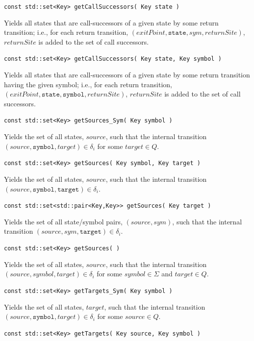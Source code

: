 \documentclass{llncs}
\begin{document}
\begin{description}
  \item\texttt{const std::set<Key> getCallSuccessors( Key state )}

    Yields all states that are call-successors of a given state by some return transition; i.e., for each return transition, $(exitPoint,\texttt{state},sym,returnSite)$, $returnSite$ is added to the set of call successors.

  \item\texttt{const std::set<Key> getCallSuccessors( Key state, Key symbol )}

    Yields all states that are call-successors of a given state by some return transition having the given symbol; i.e., for each return transition, $(exitPoint,\texttt{state},\texttt{symbol},returnSite)$, $returnSite$ is added to the set of call successors.

  \item\texttt{const std::set<Key> getSources\_Sym( Key symbol )}

    Yields the set of all states, $source$, such that the internal transition $(source,\texttt{symbol},target) \in \delta_i$ for some $target \in Q$.

  \item\texttt{const std::set<Key> getSources( Key symbol, Key target )}

    Yields the set of all states, $source$, such that the internal transition $(source,\texttt{symbol},\texttt{target}) \in \delta_i$.

  \item\texttt{const std::set<std::pair<Key,Key>> getSources( Key target )}

    Yields the set of all state/symbol pairs, $(source,sym)$, such that the internal transition $(source,sym,\texttt{target}) \in \delta_i$.

  \item\texttt{const std::set<Key> getSources( )}

    Yields the set of all states, $source$, such that the internal transition $(source,symbol,target) \in \delta_i$ for some $symbol \in \Sigma$ and $target \in Q$.

  \item\texttt{const std::set<Key> getTargets\_Sym( Key symbol )}

    Yields the set of all states, $target$, such that the internal transition $(source,\texttt{symbol},target) \in \delta_i$ for some $source \in Q$.

  \item\texttt{const std::set<Key> getTargets( Key source, Key symbol )}


\end{description}
\end{document}
